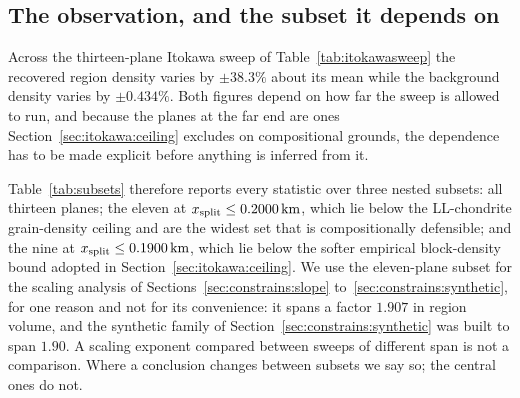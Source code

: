 \subsection{The observation, and the subset it depends on}
\label{sec:constrains:observation}

Across the thirteen-plane Itokawa sweep of Table~\ref{tab:itokawasweep} the
recovered region density varies by $\pm38.3\%$ about its mean while the
background density varies by $\pm0.434\%$. Both figures depend on how far
the sweep is allowed to run, and because the planes at the far end are ones
Section~\ref{sec:itokawa:ceiling} excludes on compositional grounds, the
dependence has to be made explicit before anything is inferred from it.

Table~\ref{tab:subsets} therefore reports every statistic over three nested
subsets: all thirteen planes; the eleven at
$x_{\mathrm{split}} \le \SI{0.2000}{\kilo\metre}$, which lie below the LL-chondrite
grain-density ceiling and are the widest set that is compositionally
defensible; and the nine at $x_{\mathrm{split}} \le \SI{0.1900}{\kilo\metre}$, which
lie below the softer empirical block-density bound adopted in
Section~\ref{sec:itokawa:ceiling}. We use the eleven-plane subset for the
scaling analysis of Sections~\ref{sec:constrains:slope}
to~\ref{sec:constrains:synthetic}, for one reason and not for its
convenience: it spans a factor $1.907$ in region volume, and the synthetic
family of Section~\ref{sec:constrains:synthetic} was built to span $1.90$.
A scaling exponent compared between sweeps of different span is not a
comparison. Where a conclusion changes between subsets we say so; the
central ones do not.

